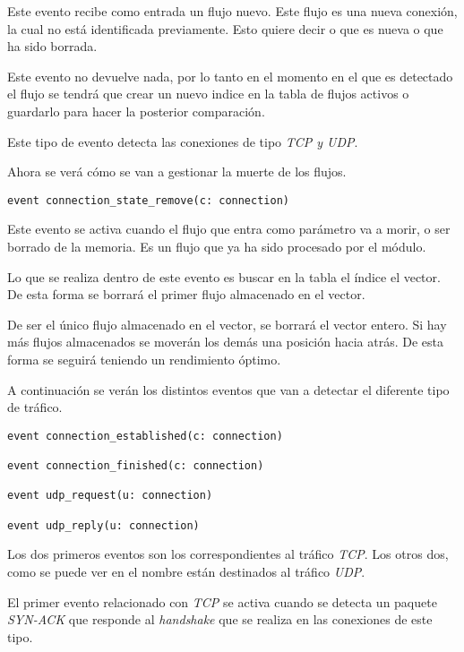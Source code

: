 \intro Este evento recibe como entrada un flujo nuevo. Este flujo es una nueva conexión, la cual no está identificada 
previamente. Esto quiere decir o que es nueva o que ha sido borrada.

\intro Este evento no devuelve nada, por lo tanto en el momento en el que es detectado el flujo se tendrá que crear 
un nuevo indice en la tabla de flujos activos o guardarlo para hacer la posterior comparación.

\intro Este tipo de evento detecta las conexiones de tipo \textit{TCP y UDP}.

\intro Ahora se verá cómo se van a gestionar la muerte de los flujos.

\begin{lstlisting}[style=CodigoC]
event connection_state_remove(c: connection)

\end{lstlisting}

\intro Este evento se activa cuando el flujo que entra como parámetro va a morir, o ser borrado de la memoria. Es un flujo 
que ya ha sido procesado por el módulo.

\intro Lo que se realiza dentro de este evento es buscar en la tabla el índice el vector. De esta forma 
se borrará el primer flujo almacenado en el vector.

\intro De ser el único flujo almacenado en el vector, se borrará el vector entero. Si hay más flujos almacenados 
se moverán los demás una posición hacia atrás. De esta forma se seguirá teniendo un rendimiento óptimo.

\intro A continuación se verán los distintos eventos que van a detectar el diferente tipo de tráfico.

\begin{lstlisting}[style=CodigoC]
event connection_established(c: connection)

event connection_finished(c: connection)

event udp_request(u: connection)

event udp_reply(u: connection)

\end{lstlisting}

\intro Los dos primeros eventos son los correspondientes al tráfico \textit{TCP}. Los otros dos, como se puede ver 
en el nombre están destinados al tráfico \textit{UDP}.

\intro El primer evento relacionado con \textit{TCP} se activa cuando se detecta un paquete \textit{SYN-ACK} que 
responde al \textit{handshake} que se realiza en las conexiones de este tipo.

